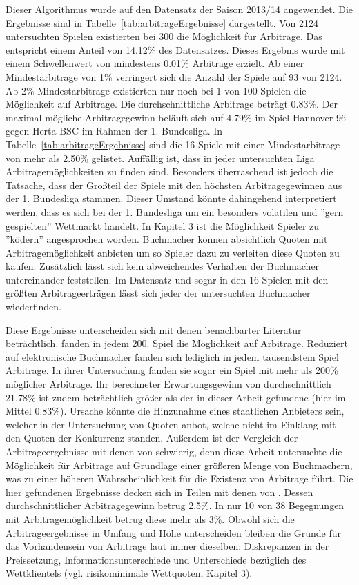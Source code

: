 Dieser Algorithmus wurde auf den Datensatz der Saison 2013/14 angewendet. Die Ergebnisse sind in Tabelle~\ref{tab:arbitrageErgebnisse} dargestellt. Von 2124 untersuchten Spielen existierten bei 300 die Möglichkeit für Arbitrage. Das entspricht einem Anteil von 14.12\% des Datensatzes. Dieses Ergebnis wurde mit einem Schwellenwert von mindestens 0.01\% Arbitrage erzielt. Ab einer Mindestarbitrage von 1\% verringert sich die Anzahl der Spiele auf 93 von 2124. Ab 2\% Mindestarbitrage existierten nur noch bei 1 von 100 Spielen die Möglichkeit auf Arbitrage. Die durchschnittliche Arbitrage beträgt 0.83\%. Der maximal mögliche Arbitragegewinn beläuft sich auf 4.79\% im Spiel Hannover 96 gegen Herta BSC im Rahmen der 1. Bundesliga. In Tabelle~\ref{tab:arbitrageErgebnisse} sind die 16 Spiele mit einer Mindestarbitrage von mehr als 2.50\% gelistet. Auffällig ist, dass in jeder untersuchten Liga Arbitragemöglichkeiten zu finden sind. Besonders überraschend ist jedoch die Tatsache, dass der Großteil der Spiele mit den höchsten Arbitragegewinnen aus der 1. Bundesliga stammen. Dieser Umstand könnte dahingehend interpretiert werden, dass es sich bei der 1. Bundesliga um ein besonders volatilen und ''gern gespielten'' Wettmarkt handelt. In Kapitel 3 ist die Möglichkeit Spieler zu ''ködern'' angesprochen worden. Buchmacher können absichtlich Quoten mit Arbitragemöglichkeit anbieten um so Spieler dazu zu verleiten diese Quoten zu kaufen. Zusätzlich lässt sich kein abweichendes Verhalten der Buchmacher untereinander feststellen. Im Datensatz und sogar in den 16 Spielen mit den größten Arbitrageerträgen lässt sich jeder der untersuchten Buchmacher wiederfinden.

Diese Ergebnisse unterscheiden sich mit denen benachbarter Literatur beträchtlich. \citet[S. 434]{vlastakis2009efficient} fanden in jedem 200. Spiel die Möglichkeit auf Arbitrage. Reduziert auf elektronische Buchmacher fanden sich lediglich in jedem tausendstem Spiel Arbitrage. In ihrer Untersuchung fanden sie sogar ein Spiel mit mehr als 200\% möglicher Arbitrage. Ihr berechneter Erwartungsgewinn von durchschnittlich 21.78\% ist zudem beträchtlich größer als der in dieser Arbeit gefundene (hier im Mittel 0.83\%). Ursache könnte die Hinzunahme eines staatlichen Anbieters sein, welcher in der Untersuchung von \citeauthor{vlastakis2009efficient} Quoten anbot, welche nicht im Einklang mit den Quoten der Konkurrenz standen. Außerdem ist der Vergleich der Arbitrageergebnisse mit denen von \citeauthor{vlastakis2009efficient} schwierig, denn diese Arbeit untersuchte die Möglichkeit für Arbitrage auf Grundlage einer größeren Menge von Buchmachern, was zu einer höheren Wahrscheinlichkeit für die Existenz von Arbitrage führt. Die hier gefundenen Ergebnisse decken sich in Teilen mit denen von \citet[S. 361-363]{barth2012oekonomie}. Dessen durchschnittlicher Arbitragegewinn betrug 2.5\%. In nur 10 von 38 Begegnungen mit Arbitragemöglichkeit betrug diese mehr als 3\%. Obwohl sich die Arbitrageergebnisse in Umfang und Höhe unterscheiden bleiben die Gründe für das Vorhandensein von Arbitrage laut \citet[434]{vlastakis2009efficient} immer dieselben: Diskrepanzen in der Preissetzung, Informationsunterschiede und Unterschiede bezüglich des Wettklientels (vgl. risikominimale Wettquoten, Kapitel 3).

